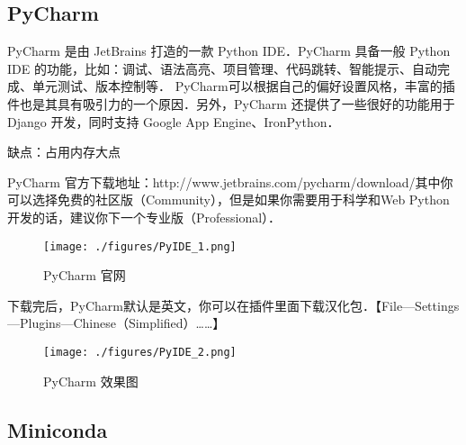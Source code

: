 
\begin{issues}
\issueTODO
\end{issues}

\subsection{PyCharm}

PyCharm 是由 JetBrains 打造的一款 Python IDE．PyCharm 具备一般 Python IDE 的功能，比如：调试、语法高亮、项目管理、代码跳转、智能提示、自动完成、单元测试、版本控制等． PyCharm可以根据自己的偏好设置风格，丰富的插件也是其具有吸引力的一个原因．另外，PyCharm 还提供了一些很好的功能用于 Django 开发，同时支持 Google App Engine、IronPython．

缺点：占用内存大点

PyCharm 官方下载地址：http://www.jetbrains.com/pycharm/download/其中你可以选择免费的社区版（Community），但是如果你需要用于科学和Web Python开发的话，建议你下一个专业版（Professional）．

\begin{figure}[ht]
\centering
\texttt{[image: ./figures/PyIDE\_1.png]}
\caption{PyCharm 官网} \label{PyIDE_fig1}
\end{figure}

下载完后，PyCharm默认是英文，你可以在插件里面下载汉化包．【File—Settings—Plugins—Chinese（Simplified）……】

\begin{figure}[ht]
\centering
\texttt{[image: ./figures/PyIDE\_2.png]}
\caption{PyCharm 效果图} \label{PyIDE_fig2}
\end{figure}

\subsection{Miniconda}
